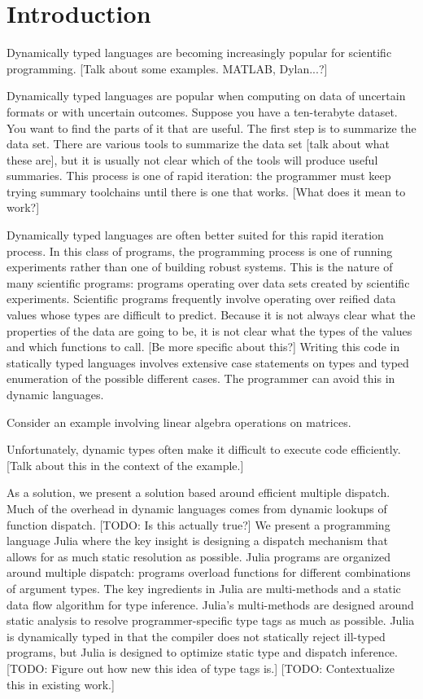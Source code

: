 \section{Introduction}

Dynamically typed languages are becoming increasingly popular for scientific programming. [Talk about some examples. MATLAB, Dylan...?]

Dynamically typed languages are popular when computing on data of uncertain formats or with uncertain outcomes. Suppose you have a ten-terabyte dataset. You want to find the parts of it that are useful. The first step is to summarize the data set. There are various tools to summarize the data set [talk about what these are], but it is usually not clear which of the tools will produce useful summaries. This process is one of rapid iteration: the programmer must keep trying summary toolchains until there is one that works. [What does it mean to work?]

Dynamically typed languages are often better suited for this rapid iteration process. In this class of programs, the programming process is one of running experiments rather than one of building robust systems. This is the nature of many scientific programs: programs operating over data sets created by scientific experiments. Scientific programs frequently involve operating over reified data values whose types are difficult to predict. Because it is not always clear what the properties of the data are going to be, it is not clear what the types of the values and which functions to call. [Be more specific about this?] Writing this code in statically typed languages involves extensive case statements on types and typed enumeration of the possible different cases. The programmer can avoid this in dynamic languages.

Consider an example involving linear algebra operations on matrices.

Unfortunately, dynamic types often make it difficult to execute code efficiently. [Talk about this in the context of the example.]

As a solution, we present a solution based around efficient multiple dispatch. Much of the overhead in dynamic languages comes from dynamic lookups of function dispatch. [TODO: Is this actually true?] We present a programming language Julia where the key insight is designing a dispatch mechanism that allows for as much static resolution as possible. Julia programs are organized around multiple dispatch: programs overload functions for different combinations of argument types. The key ingredients in Julia are multi-methods and a static data flow algorithm for type inference. Julia’s multi-methods are designed around static analysis to resolve programmer-specific type tags as much as possible. Julia is dynamically typed in that the compiler does not statically reject ill-typed programs, but Julia is designed to optimize static type and dispatch inference.
 [TODO: Figure out how new this idea of type tags is.] [TODO: Contextualize this in existing work.]

